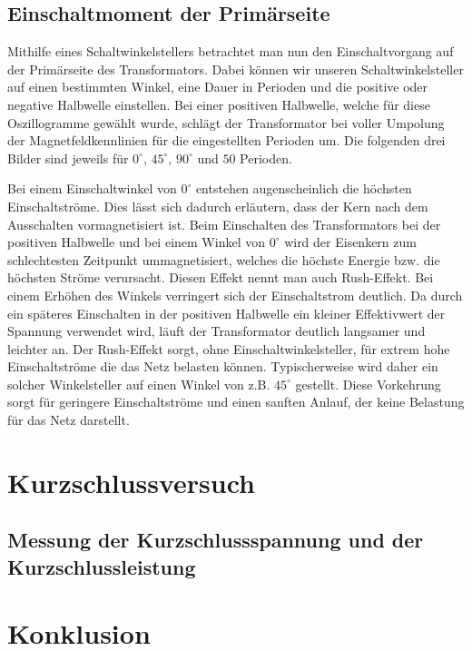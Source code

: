 \documentclass{article}
\begin{document}
\subsection{Einschaltmoment der Primärseite}
\label{sec:einsch-der-prim}

Mithilfe eines Schaltwinkelstellers betrachtet man nun den Einschaltvorgang auf der Primärseite des Transformators. Dabei können wir unseren Schaltwinkelsteller auf einen bestimmten Winkel, eine Dauer in Perioden und die positive oder negative Halbwelle einstellen.
Bei einer positiven Halbwelle, welche für diese Oszillogramme gewählt wurde, schlägt der Transformator bei voller Umpolung der Magnetfeldkennlinien für die eingestellten Perioden um. Die folgenden drei Bilder sind jeweils für $0^{\circ}$, $45^{\circ}$, $90^{\circ}$ und $50$ Perioden.



Bei einem Einschaltwinkel von $0^{\circ}$ entstehen augenscheinlich die höchsten Einschaltströme. Dies lässt sich dadurch erläutern, dass der Kern nach dem Ausschalten vormagnetisiert ist. Beim Einschalten des Transformators bei der positiven Halbwelle und bei einem Winkel von $0^{\circ}$ wird der Eisenkern zum schlechtesten Zeitpunkt ummagnetisiert, welches die höchste Energie bzw. die höchsten Ströme verursacht. Diesen Effekt nennt man auch Rush-Effekt. Bei einem Erhöhen des Winkels verringert sich der Einschaltstrom deutlich. Da durch ein späteres Einschalten in der positiven Halbwelle ein kleiner Effektivwert der Spannung verwendet wird, läuft der Transformator deutlich langsamer und leichter an. Der Rush-Effekt sorgt, ohne Einschaltwinkelsteller, für extrem hohe Einschaltströme die das Netz belasten können. Typischerweise wird daher ein solcher Winkelsteller auf einen Winkel von z.B. $45^{\circ}$ gestellt. Diese Vorkehrung sorgt für geringere Einschaltströme und einen sanften Anlauf, der keine Belastung für das Netz darstellt.


\section{Kurzschlussversuch}
\label{sec:kurzschlussversuch}

\subsection{Messung der Kurzschlussspannung und der Kurzschlussleistung}
\label{sec:mess-der-kurzschl}


\section{Konklusion}
\label{sec:konklusion}
\end{document}
